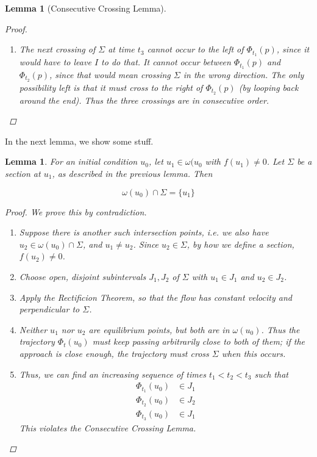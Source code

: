 \documentclass{article}
\newtheorem{lemma}[theorem]{Lemma}
\begin{document}
\begin{lemma}[Consecutive Crossing Lemma]
\begin{proof}
\begin{enumerate}
\item The next crossing of $\Sigma$ at time $t_3$ cannot occur to the left of $\Phi_{t_1}(p)$, since it would have to leave $I$ to do that. It cannot occur between $\Phi_{t_1}(p)$ and $\Phi_{t_2}(p)$, since that would mean crossing $\Sigma$ in the wrong direction. The only possibility left is that it must cross to the right of $\Phi_{t_2}(p)$ (by looping back around the end). Thus the three crossings are in consecutive order. 

\end{enumerate}
\end{proof}
\end{lemma}

In the next lemma, we show some stuff.

\begin{lemma}For an initial condition $u_0$, let $u_1 \in \omega(u_0$ with $f(u_1) \neq 0$. Let $\Sigma$ be a section at $u_1$, as described in the previous lemma. Then

\[
\omega(u_0) \cap \Sigma = \{ u_1 \}
\]

\begin{proof}
We prove this by contradiction.
\begin{enumerate}
\item Suppose there is another such intersection points, i.e. we also have $u_2 \in \omega(u_0) \cap \Sigma$, and $u_1 \neq u_2$. Since $u_2 \in \Sigma$, by how we define a section, $f(u_2) \neq 0$. 
\item Choose open, disjoint subintervals $J_1, J_2$ of $\Sigma$ with $u_1 \in J_1$ and $u_2 \in J_2$.
\item Apply the Rectificion Theorem, so that the flow has constant velocity and perpendicular to $\Sigma$.
\item Neither $u_1$ nor $u_2$ are equilibrium points, but both are in $\omega(u_0)$. Thus the trajectory $\Phi_t(u_0)$ must keep passing arbitrarily close to both of them; if the approach is close enough, the trajectory must cross $\Sigma$ when this occurs.
\item Thus, we can find an increasing sequence of times $t_1 < t_2 < t_3$ such that
\begin{align*}
\Phi_{t_1}(u_0) &\in J_1 \\
\Phi_{t_2}(u_0) &\in J_2 \\
\Phi_{t_3}(u_0) &\in J_1
\end{align*}
This violates the Consecutive Crossing Lemma.
\end{enumerate}
\end{proof}
\end{lemma}
\end{document}
